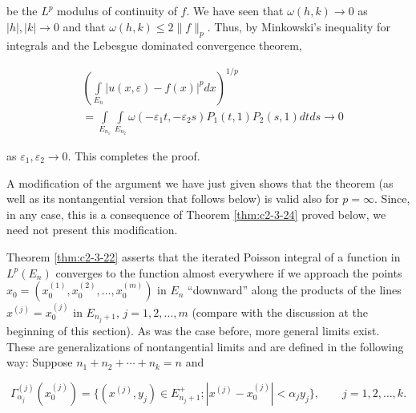 be the $L^p$ modulus of continuity of $f$. We have seen that $\omega(h, k) \to 0$ as $|h|, |k| \to 0$ and that $\omega(h, k) \leq 2 \| f\|_p$. Thus, by Minkowski's inequality for integrals and the Lebesgue dominated convergence theorem,

\[
\begin{aligned}&\left(\int\limits_{E_{n}}|u(x,\varepsilon)-f(x)|^{p} dx\right)^{1/p}\\&=\int\limits_{E_{n_{1}}}\int\limits_{E_{n_{2}}}\omega(-\varepsilon_{1}t,-\varepsilon_{2}s)P_{1}(t,1)P_{2}(s,1)dt ds\rightarrow0\end{aligned}
\]

as $\varepsilon_{1}, \varepsilon_{2} \rightarrow 0$. This completes the proof.

A modification of the argument we have just given shows that the theorem (as well as its nontangential version that follows below) is valid also for $p = \infty$. Since, in any case, this is a consequence of Theorem \ref{thm:c2-3-24} proved below, we need not present this modification.

Theorem \ref{thm:c2-3-22} asserts that the iterated Poisson integral of a function in $L^{p}(E_{n})$ converges to the function almost everywhere if we approach the points $x_{0} = (x_{0}^{(1)}, x_{0}^{(2)}, \ldots, x_{0}^{(m)})$ in $E_{n}$ ``downward'' along the products of the lines $x^{(j)} = x_{0}^{(j)}$ in $E_{n_j+1}$, $j = 1, 2, \ldots, m$ (compare with the discussion at the beginning of this section). As was the case before, more general limits exist. These are generalizations of nontangential limits and are defined in the following way: Suppose $n_1 + n_2 + \cdots + n_k = n$ and

\[
\Gamma_{\alpha_{j}}^{(j)}(x_{0}^{(j)})=\{(x^{(j)},y_{j})\in E_{n_{j}+1}^{+};|x^{(j)}-x_{0}^{(j)}|<\alpha_{j}y_{j}\},\qquad j=1,2,\ldots,k.
\]

